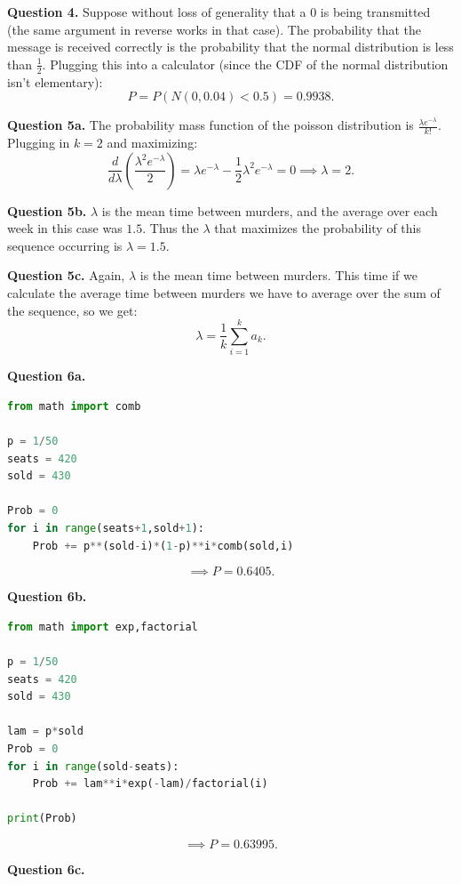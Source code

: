 \documentclass[letterpaper, reqno,11pt]{article}
\begin{document}
{\medskip\noindent\bf Question 4.} Suppose without loss of generality that a 0 is being transmitted (the same argument in reverse works in that case). The probability that the message is received correctly is the probability that the normal distribution is less than $\frac{1}{2}$. Plugging this into a calculator (since the CDF of the normal distribution isn't elementary): 
\[
P=P(N(0,0.04)<0.5)=0.9938
.\]

{\medskip\noindent\bf Question 5a.} The probability mass function of the poisson distribution is $\frac{\lambda e^{-\lambda}}{k!}$. Plugging in $k=2$ and maximizing:
\[
    \frac{d}{d\lambda}\left( \frac{\lambda ^2e^{-\lambda}}{2} \right) =\lambda e^{-\lambda}-\frac{1}{2}\lambda^2e^{-\lambda}=0\implies \lambda=2 
.\]

{\medskip\noindent\bf Question 5b.} $\lambda$ is the mean time between murders, and the average over each week in this case was $1.5$. Thus the $\lambda$ that maximizes the probability of this sequence occurring is $\lambda=1.5$. 

{\medskip\noindent\bf Question 5c.} Again, $\lambda$ is the mean time between murders. This time if we calculate the average time between murders we have to average over the sum of the sequence, so we get: 
\[
\lambda = \frac{1}{k}\sum_{i=1}^{k}a_k
.\]

{\medskip\noindent\bf Question 6a.} 

\begin{lstlisting}[language=Python]
from math import comb

p = 1/50
seats = 420
sold = 430

Prob = 0
for i in range(seats+1,sold+1):
    Prob += p**(sold-i)*(1-p)**i*comb(sold,i)
\end{lstlisting}

\[
\implies P=0.6405
.\]

{\medskip\noindent\bf Question 6b.} 

\begin{lstlisting}[language=Python]
from math import exp,factorial

p = 1/50
seats = 420
sold = 430

lam = p*sold
Prob = 0
for i in range(sold-seats):
    Prob += lam**i*exp(-lam)/factorial(i)

print(Prob)
\end{lstlisting}

\[
\implies P=0.63995
.\]

{\medskip\noindent\bf Question 6c.} 
\end{document}
